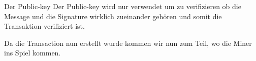 \noindent
Der Public-key
Der Public-key wird nur verwendet um zu verifizieren ob die Message und die Signature wirklich zueinander gehören und somit die Transaktion verifiziert ist.

\noindent
Da die Transaction nun erstellt wurde kommen wir nun zum Teil, wo die Miner ins Spiel kommen.





\newpage
